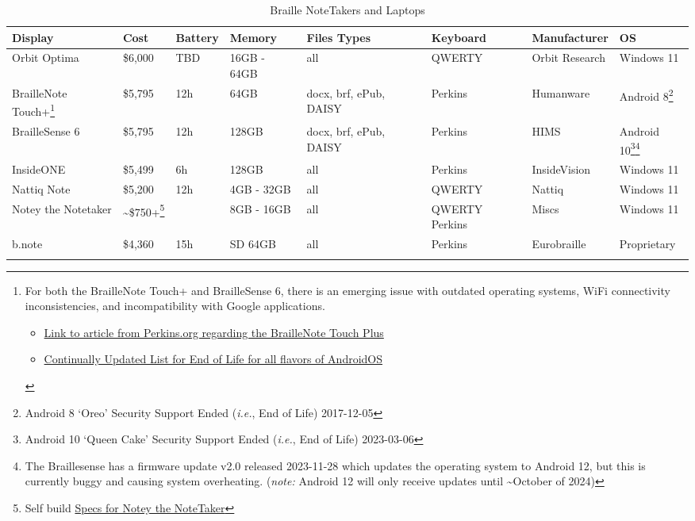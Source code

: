 \documentclass[14pt, letterpaper,twoside]{extreport}
\begin{document}
\begin{longtable}[]{@{}
 >{\raggedright\arraybackslash}p{}
 >{\raggedright\arraybackslash}p{}
 >{\raggedright\arraybackslash}p{}
 >{\raggedright\arraybackslash}p{}
 >{\raggedright\arraybackslash}p{}
 >{\raggedright\arraybackslash}p{}
 >{\raggedright\arraybackslash}p{}
 >{\raggedright\arraybackslash}p{}@{}
 }
\toprule\noalign{}

\textbf{Display}
& 
\textbf{Cost}
& 
\textbf{Battery}
& 
\textbf{Memory}
&
\textbf{Files Types}
&
\textbf{Keyboard}
&
\textbf{Manufacturer}
&
\textbf{OS}
\\
\midrule\noalign{}
\endhead
\bottomrule\noalign{}
\endlastfoot
Orbit Optima & \$6,000 & TBD & 16GB - 64GB & all & QWERTY & Orbit Research & Windows 11 \\[1.0em]
BrailleNote Touch+\footnote{For both the BrailleNote Touch+ and BrailleSense 6, there is an emerging issue with outdated operating systems, WiFi connectivity inconsistencies, and incompatibility with Google applications. \begin{itemize}
\item
 \href{https://perkins.org/braillenote-touch-outdated-os/}{Link to article from Perkins.org regarding the BrailleNote Touch Plus}
\item
 \href{https://endoflife.date/android}{Continually Updated List for End of Life for all flavors of AndroidOS}
\end{itemize}} & \$5,795 & 12h & 64GB & docx, brf, ePub, DAISY & Perkins & Humanware & Android 8\footnote{Android 8 `Oreo' Security Support Ended (\emph{i.e.}, End of Life) 2017-12-05} \\[1.0em]
BrailleSense 6 & \$5,795 & 12h & 128GB & docx, brf, ePub, DAISY & Perkins & HIMS & Android 10\footnote{Android 10 `Queen Cake' Security Support Ended (\emph{i.e.}, End of Life) 2023-03-06}\footnote{The Braillesense has a firmware update v2.0 released 2023-11-28 which updates the operating system to Android 12, but this is currently buggy and causing system overheating. (\emph{note:} Android 12 will only receive updates until \textasciitilde October of 2024)} \\[1.0em]
InsideONE & \$5,499 & 6h & 128GB & all & Perkins & InsideVision & Windows 11 \\[1.0em]
Nattiq Note & \$5,200 & 12h & 4GB - 32GB & all & QWERTY & Nattiq & Windows 11 \\[1.0em]
Notey the Notetaker & \textasciitilde\$750+\footnote{Self build
\href{https://notey-project.com/2023/03/07/notey-user-manual-v1-0-2/}{Specs for Notey the NoteTaker}} & & 8GB - 16GB & all & QWERTY Perkins & Miscs & Windows 11 \\[1.0em]
b.note & \$4,360 & 15h & SD 64GB & all & Perkins & Eurobraille & Proprietary \\[1.0em]\hline
\caption{ Braille NoteTakers and Laptops }
\end{longtable}
\end{document}
